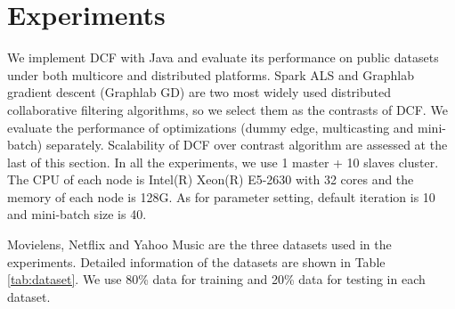 \documentclass{llncs}
\begin{document}
\section{Experiments}
\label{sec:experiment}
\vspace{-5pt}


We implement DCF with Java and evaluate its performance on public datasets under both multicore and distributed platforms. Spark ALS \cite{SparkMllib} and Graphlab \cite{graphlab} gradient descent (Graphlab GD) are two most widely used distributed collaborative filtering algorithms, so we select them as the contrasts of DCF. We evaluate the performance of optimizations (dummy edge, multicasting and mini-batch) separately. Scalability of DCF over contrast algorithm are assessed at the last of this section. In all the experiments, we use 1 master + 10 slaves cluster. The CPU of each node is Intel(R) Xeon(R) E5-2630 with 32 cores and the memory of each node is 128G. As for parameter setting, default iteration is 10 and mini-batch size is 40.


Movielens, Netflix and Yahoo Music are the three datasets used in the experiments. Detailed information of the datasets are shown in Table \ref{tab:dataset}. We use 80\% data for training and 20\% data for testing in each dataset.
\end{document}
